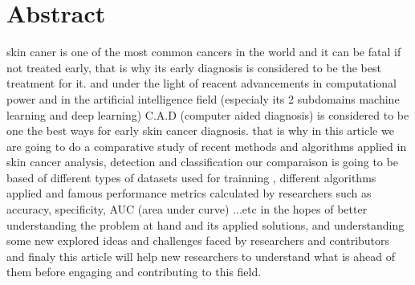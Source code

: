 \section*{Abstract}
skin caner is one of the most common cancers in the world and it can be fatal if not treated early, that is why its early diagnosis is considered to be the best treatment for it. and under the light of reacent advancements in computational power and in the artificial intelligence field (especialy its 2 subdomains machine learning and deep learning) C.A.D (computer aided diagnosis) is considered to be one the best ways for early skin cancer diagnosis. that is why in this article we are going to do a comparative study of recent methods and algorithms applied in skin cancer analysis, detection and classification our comparaison is going to be based of different types of datasets used for trainning , different algorithms applied and famous performance metrics calculated by researchers such as accuracy, specificity, AUC (area under curve) ...etc in the hopes of better understanding the problem at hand and its applied solutions, and understanding some new explored ideas and challenges faced by researchers and contributors and finaly this article will help new researchers to understand what is ahead of them before engaging and contributing to this field.



